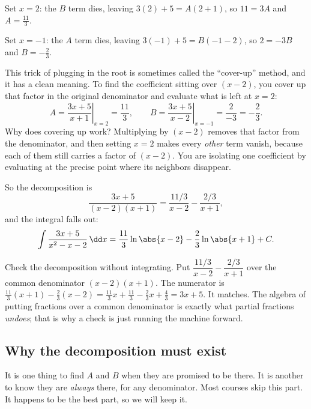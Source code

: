 Set $x = 2$: the $B$ term dies, leaving $3(2)+5 = A(2+1)$, so $11 = 3A$ and
$A = \tfrac{11}{3}$.

Set $x = -1$: the $A$ term dies, leaving $3(-1)+5 = B(-1-2)$, so $2 = -3B$ and
$B = -\tfrac{2}{3}$.

\begin{intuitionbox}
This trick of plugging in the root is sometimes called the ``cover-up''
method, and it has a clean meaning. To find the coefficient sitting over
$(x-2)$, you cover up that factor in the original denominator and evaluate
what is left at $x = 2$:
\[
A = \left.\frac{3x+5}{x+1}\right|_{x=2} = \frac{11}{3},
\qquad
B = \left.\frac{3x+5}{x-2}\right|_{x=-1} = \frac{2}{-3} = -\frac{2}{3}.
\]
Why does covering up work? Multiplying by $(x-2)$ removes that factor from the
denominator, and then setting $x = 2$ makes every \emph{other} term vanish,
because each of them still carries a factor of $(x-2)$. You are isolating one
coefficient by evaluating at the precise point where its neighbors disappear.
\end{intuitionbox}

So the decomposition is
\[
\frac{3x+5}{(x-2)(x+1)} = \frac{11/3}{x-2} - \frac{2/3}{x+1},
\]
and the integral falls out:
\[
\int \frac{3x+5}{x^2-x-2}\,\dd x
= \frac{11}{3}\ln\abs{x-2} - \frac{2}{3}\ln\abs{x+1} + C.
\]

\begin{labbox}
Check the decomposition without integrating. Put $\dfrac{11/3}{x-2} -
\dfrac{2/3}{x+1}$ over the common denominator $(x-2)(x+1)$. The numerator is
$\tfrac{11}{3}(x+1) - \tfrac{2}{3}(x-2) = \tfrac{11}{3}x + \tfrac{11}{3}
- \tfrac{2}{3}x + \tfrac{4}{3} = 3x + 5$. It matches. The algebra of putting
fractions over a common denominator is exactly what partial fractions
\emph{undoes}; that is why a check is just running the machine forward.
\end{labbox}

\subsection{Why the decomposition must exist}
\label{ch24:why-pf-exists}

It is one thing to find $A$ and $B$ when they are promised to be there. It is
another to know they are \emph{always} there, for any denominator. Most courses
skip this part. It happens to be the best part, so we will keep it.

